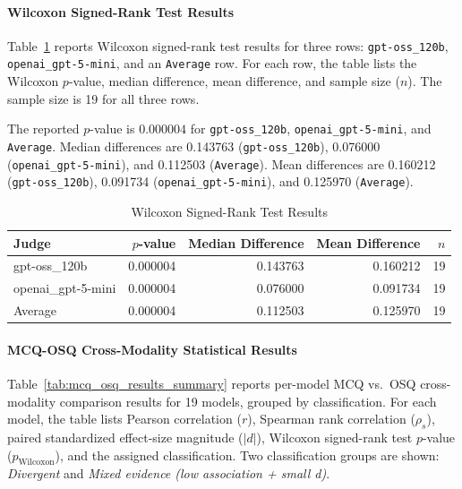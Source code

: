 \paragraph{Wilcoxon Signed-Rank Test Results}
Table~\ref{tab:wilcoxon} reports Wilcoxon signed-rank test results for three rows: \texttt{gpt-oss\_120b}, \texttt{openai\_gpt-5-mini}, and an \texttt{Average} row. For each row, the table lists the Wilcoxon \(p\)-value, median difference, mean difference, and sample size (\(n\)). The sample size is 19 for all three rows.

The reported \(p\)-value is \(0.000004\) for \texttt{gpt-oss\_120b}, \texttt{openai\_gpt-5-mini}, and \texttt{Average}. Median differences are 0.143763 (\texttt{gpt-oss\_120b}), 0.076000 (\texttt{openai\_gpt-5-mini}), and 0.112503 (\texttt{Average}). Mean differences are 0.160212 (\texttt{gpt-oss\_120b}), 0.091734 (\texttt{openai\_gpt-5-mini}), and 0.125970 (\texttt{Average}).


\begin{table}[htbp]
\centering
\caption{Wilcoxon Signed-Rank Test Results}
\label{tab:wilcoxon}
\begin{tabular}{lrrrr}
\toprule
Judge & $p$-value & Median Difference & Mean Difference & $n$ \\
\midrule
gpt-oss\_120b & 0.000004 & 0.143763 & 0.160212 & 19 \\
openai\_gpt-5-mini & 0.000004 & 0.076000 & 0.091734 & 19 \\
Average & 0.000004 & 0.112503 & 0.125970 & 19 \\
\bottomrule
\end{tabular}
\end{table}





\paragraph{MCQ-OSQ Cross-Modality Statistical Results}
Table~\ref{tab:mcq_osq_results_summary} reports per-model MCQ vs.\ OSQ cross-modality comparison results for 19 models, grouped by classification. For each model, the table lists Pearson correlation (\(r\)), Spearman rank correlation (\(\rho_s\)), paired standardized effect-size magnitude (\(|d|\)), Wilcoxon signed-rank test \(p\)-value (\(p_{\text{Wilcoxon}}\)), and the assigned classification. Two classification groups are shown: \emph{Divergent} and \emph{Mixed evidence (low association + small d)}.

